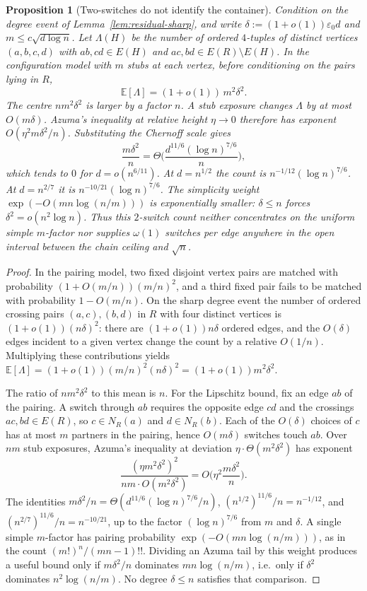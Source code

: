 \documentclass[11pt]{article}
\newtheorem{proposition}[theorem]{Proposition}
\newcommand{\EE}{\mathbb{E}}
\begin{document}
\begin{proposition}[Two-switches do not identify the container]
\label{prop:switch-barrier}
Condition on the degree event of Lemma~\ref{lem:residual-sharp}, and write
\(\delta:=(1+o(1))\varepsilon_0 d\) and \(m\le c\sqrt{d\log n}\).
Let \(\Lambda(H)\) be the number of ordered \(4\)-tuples of distinct vertices
\((a,b,c,d)\) with \(ab,cd\in E(H)\) and \(ac,bd\in E(R)\setminus E(H)\).
In the configuration model with \(m\) stubs at each vertex, before conditioning on
the pairs lying in \(R\),
\[
\EE[\Lambda]=(1+o(1))\,m^2\delta^2.
\]
The centre \(nm^2\delta^2\) is larger by a factor \(n\).
A stub exposure changes \(\Lambda\) by at most \(O(m\delta)\). Azuma's inequality at
relative height \(\eta\to 0\) therefore has exponent
\(O(\eta^2 m\delta^2/n)\). Substituting the Chernoff scale gives
\[
\frac{m\delta^2}{n}
=
\Theta\Biggl(\frac{d^{11/6}(\log n)^{7/6}}{n}\Biggr),
\]
which tends to \(0\) for \(d=o(n^{6/11})\).
At \(d=n^{1/2}\) the count is \(n^{-1/12}(\log n)^{7/6}\).
At \(d=n^{2/7}\) it is \(n^{-10/21}(\log n)^{7/6}\).
The simplicity weight \(\exp(-O(mn\log(n/m)))\) is exponentially smaller:
\(\delta\le n\) forces \(\delta^2=o(n^2\log n)\).
Thus this \(2\)-switch count neither concentrates on the uniform simple
\(m\)-factor nor supplies \(\omega(1)\) switches per edge anywhere in the open
interval between the chain ceiling and \(\sqrt{n}\).
\end{proposition}

\begin{proof}
In the pairing model, two fixed disjoint vertex pairs are matched with probability
\((1+O(m/n))(m/n)^2\), and a third fixed pair fails to be matched with probability
\(1-O(m/n)\).
On the sharp degree event the number of ordered crossing pairs \((a,c),(b,d)\) in \(R\)
with four distinct vertices is \((1+o(1))(n\delta)^2\): there are \((1+o(1))n\delta\)
ordered edges, and the \(O(\delta)\) edges incident to a given vertex change the count
by a relative \(O(1/n)\).
Multiplying these contributions yields
\(\EE[\Lambda]=(1+o(1))(m/n)^2(n\delta)^2=(1+o(1))m^2\delta^2\).

The ratio of \(nm^2\delta^2\) to this mean is \(n\).
For the Lipschitz bound, fix an edge \(ab\) of the pairing. A switch through \(ab\)
requires the opposite edge \(cd\) and the crossings \(ac,bd\in E(R)\), so \(c\in N_R(a)\)
and \(d\in N_R(b)\). Each of the \(O(\delta)\) choices of \(c\) has at most \(m\) partners
in the pairing, hence \(O(m\delta)\) switches touch \(ab\).
Over \(nm\) stub exposures, Azuma's inequality at deviation \(\eta\cdot\Theta(m^2\delta^2)\)
has exponent
\[
\frac{(\eta m^2\delta^2)^2}{nm\cdot O(m^2\delta^2)}
=O\Biggl(\eta^2\frac{m\delta^2}{n}\Biggr).
\]
The identities
\(m\delta^2/n=\Theta(d^{11/6}(\log n)^{7/6}/n)\),
\((n^{1/2})^{11/6}/n=n^{-1/12}\), and
\((n^{2/7})^{11/6}/n=n^{-10/21}\),
up to the factor \((\log n)^{7/6}\) from \(m\) and \(\delta\).
A single simple \(m\)-factor has pairing probability
\(\exp(-O(mn\log(n/m)))\), as in the count \((m!)^n/(mn-1)!!\).
Dividing an Azuma tail by this weight produces a useful bound only if
\(m\delta^2/n\) dominates \(mn\log(n/m)\), i.e.\ only if \(\delta^2\) dominates
\(n^2\log(n/m)\). No degree \(\delta\le n\) satisfies that comparison.
\end{proof}
\end{document}
